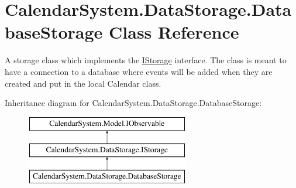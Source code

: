\hypertarget{class_calendar_system_1_1_data_storage_1_1_database_storage}{\section{Calendar\+System.\+Data\+Storage.\+Database\+Storage Class Reference}
\label{class_calendar_system_1_1_data_storage_1_1_database_storage}
}


A storage class which implements the \hyperlink{interface_calendar_system_1_1_data_storage_1_1_i_storage}{I\+Storage} interface. The class is meant to have a connection to a database where events will be added when they are created and put in the local Calendar class.  


Inheritance diagram for Calendar\+System.\+Data\+Storage.\+Database\+Storage\+:\begin{figure}[H]
\begin{center}
\leavevmode
\includegraphics[height=3.000000cm]{class_calendar_system_1_1_data_storage_1_1_database_storage}
\end{center}
\end{figure}

